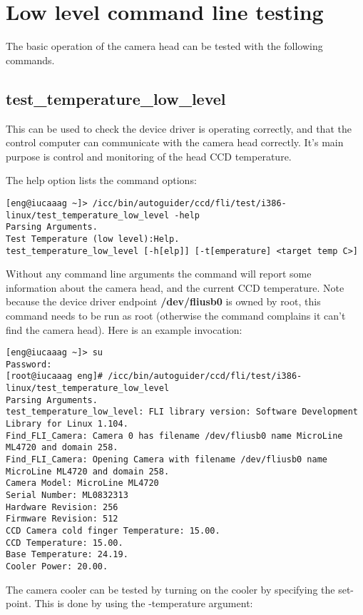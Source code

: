 \documentclass[10pt,a4paper]{article}
\begin{document}
\section{Low level command line testing}

The basic operation of the camera head can be tested with the following commands.

\subsection{test\_temperature\_low\_level}

This can be used to check the device driver is operating correctly, and that the control computer can communicate with the camera head correctly. It's main purpose is control and monitoring of the head CCD temperature.

The help option lists the command options:

\begin{verbatim}
[eng@iucaaag ~]> /icc/bin/autoguider/ccd/fli/test/i386-linux/test_temperature_low_level -help
Parsing Arguments.
Test Temperature (low level):Help.
test_temperature_low_level [-h[elp]] [-t[emperature] <target temp C>]
\end{verbatim}

Without any command line arguments the command will report some information about the camera head, and the current CCD temperature. Note because the device driver endpoint {\bf /dev/fliusb0} is owned by root, this command needs to be run as root (otherwise the command complains it can't find the camera head). Here is an example invocation:

\begin{verbatim}
[eng@iucaaag ~]> su
Password: 
[root@iucaaag eng]# /icc/bin/autoguider/ccd/fli/test/i386-linux/test_temperature_low_level
Parsing Arguments.
test_temperature_low_level: FLI library version: Software Development Library for Linux 1.104.
Find_FLI_Camera: Camera 0 has filename /dev/fliusb0 name MicroLine ML4720 and domain 258.
Find_FLI_Camera: Opening Camera with filename /dev/fliusb0 name MicroLine ML4720 and domain 258.
Camera Model: MicroLine ML4720
Serial Number: ML0832313
Hardware Revision: 256
Firmware Revision: 512
CCD Camera cold finger Temperature: 15.00.
CCD Temperature: 15.00.
Base Temperature: 24.19.
Cooler Power: 20.00.
\end{verbatim}

The camera cooler can be tested by turning on the cooler by specifying the set-point. This is done by using the -temperature argument:
\end{document}
